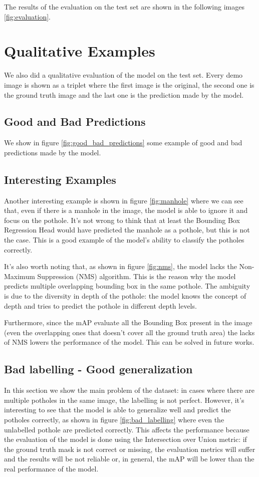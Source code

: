 The results of the evaluation on the test set are shown in the following images \ref{fig:evaluation}.


\section{Qualitative Examples}
We also did a qualitative evaluation of the model on the test set. Every demo image is shown as a triplet where the first image is the original, the second one is the ground truth image and the last one is the prediction made by the model.

\subsection*{Good and Bad Predictions}
We show in figure \ref{fig:good_bad_predictions} some example of good and bad predictions made by the model. 

\subsection*{Interesting Examples}
Another interesting example is shown in figure \ref{fig:manhole} where we can see that, even if there is a manhole in the image, the model is able to ignore it and focus on the pothole. It's not wrong to think that at least the Bounding Box Regression Head would have predicted the manhole as a pothole, but this is not the case. This is a good example of the model's ability to classify the potholes correctly.

It's also worth noting that, as shown in figure \ref{fig:nms}, the model lacks the Non-Maximum Suppression (NMS) algorithm. This is the reason why the model predicts multiple overlapping bounding box in the same pothole. The ambiguity is due to the diversity in depth of the pothole: the model knows the concept of depth and tries to predict the pothole in different depth levels.

Furthermore, since the mAP evaluate all the Bounding Box present in the image (even the overlapping ones that doesn't cover all the ground truth area) the lacks of NMS lowers the performance of the model.
This can be solved in future works. 


\subsection*{Bad labelling - Good generalization}
In this section we show the main problem of the dataset: in cases where there are multiple potholes in the same image, the labelling is not perfect.
However, it's interesting to see that the model is able to generalize well and predict the potholes correctly, as shown in figure \ref{fig:bad_labelling} where even the unlabelled pothole are predicted correctly.
This affects the performance because the evaluation of the model is done using the Intersection over Union metric: if the ground truth mask is not correct or missing, the evaluation metrics will suffer and the results will be not reliable or, in general, the mAP will be lower than the real performance of the model.

